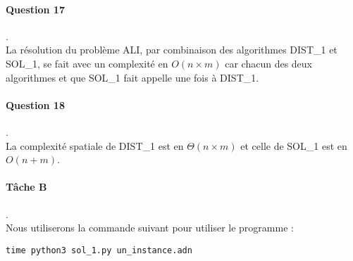 \paragraph{Question 17}.\\
La résolution du problème ALI, par combinaison des algorithmes DIST\_1 et SOL\_1, se fait avec un complexité en $O(n\times m)$ car chacun des deux algorithmes et que SOL\_1 fait appelle une fois à DIST\_1.
\paragraph{Question 18}.\\
La complexité spatiale de DIST\_1 est en $\Theta(n\times m)$ et celle de SOL\_1 est en $O(n+m)$.
\newpage
\paragraph{Tâche B}.\\
Nous utiliserons la commande suivant pour utiliser le programme :
\begin{lstlisting}
time python3 sol_1.py un_instance.adn
\end{lstlisting}

